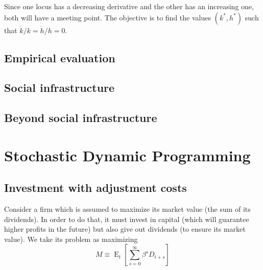 \documentclass[12pt]{report}
\newcommand{\Et}[1]{\operatorname{E}_t\left[#1\right]}
\begin{document}
Since one locus has a decreasing derivative and the other has an increasing one, both will have a meeting point. The objective is to find the values $(k^*, h^*)$ such that $\dot k/k = \dot h/h = 0$.

\section{Empirical evaluation}



\section{Social infrastructure}



\section{Beyond social infrastructure}



\chapter{Stochastic Dynamic Programming}

\section{Investment with adjustment costs}

Consider a firm which is assumed to maximize its market value (the sum of its dividends). In order to do that, it must invest in capital (which will guarantee higher profits in the future) but also give out dividends (to ensure its market value). We take its problem as maximizing $$M \equiv \Et{\sum_{s=0}^{\infty} \beta^s D_{t+s}} $$
\end{document}
